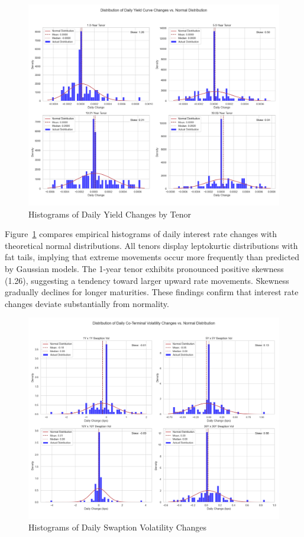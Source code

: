 \begin{figure}[H]
	\centering
	\includegraphics[width=1\textwidth]{images/descriptive_data_analysis/yield_curve_daily_changes_histogram.png}
	\caption{Histograms of Daily Yield Changes by Tenor}
	\label{fig:yield_curve_daily_changes_histogram}
\end{figure}

Figure~\ref{fig:yield_curve_daily_changes_histogram} compares empirical histograms of daily interest rate changes with theoretical normal distributions. All tenors display leptokurtic distributions with fat tails, implying that extreme movements occur more frequently than predicted by Gaussian models. The 1-year tenor exhibits pronounced positive skewness (1.26), suggesting a tendency toward larger upward rate movements. Skewness gradually declines for longer maturities. These findings confirm that interest rate changes deviate substantially from normality.

\begin{figure}[H]
	\centering
	\includegraphics[width=1\textwidth]{images/descriptive_data_analysis/vol_surface_daily_changes_histogram.png}
	\caption{Histograms of Daily Swaption Volatility Changes}
	\label{fig:vol_surface_daily_changes_histogram}
\end{figure}

